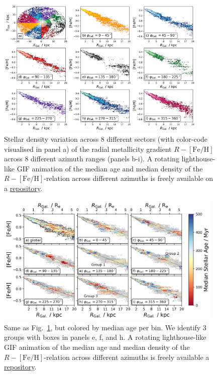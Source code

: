 \documentclass[twocolumn,apj,numberedappendix,appendixfloats]{openjournal}
\begin{document}
\begin{CJK*}{UTF8}{gbsn}
\begin{figure}
    \centering
    \includegraphics[width=0.9\textwidth]{figures/radial_metallicity_gradients_mw_in_angles.png}
    \caption{Stellar density variation across 8 different sectors (with color-code visualised in panel a) of the radial metallicity gradient $R-\mathrm{[Fe/H]}$ across 8 different azimuth ranges (panels b-i). A rotating lighthouse-like GIF animation of the median age and median density of the $R-\mathrm{[Fe/H]}$-relation across different azimuths is freely available on a \href{https://github.com/svenbuder/nihao_radial_metallicity_gradients/blob/main/figures/xyz_rfeh.gif}{repository}.}
    \label{fig:radial_metallicity_gradients_mw_in_angles}
\end{figure}

\begin{figure}
    \centering
    \includegraphics[width=0.975\textwidth]{figures/radial_metallicity_gradients_mw_in_angles_age.png}
    \caption{Same as Fig.~\ref{fig:radial_metallicity_gradients_mw_in_angles}, but colored by median age per bin. We identify 3 groups with boxes in panels e, f, and h. A rotating lighthouse-like GIF animation of the median age and median density of the $R-\mathrm{[Fe/H]}$-relation across different azimuths is freely available a \href{https://github.com/svenbuder/nihao_radial_metallicity_gradients/blob/main/figures/xyz_rfeh.gif}{repository}.}
    \label{fig:radial_metallicity_gradients_mw_in_angles_age}
\end{figure}


\end{CJK*}
\end{document}
